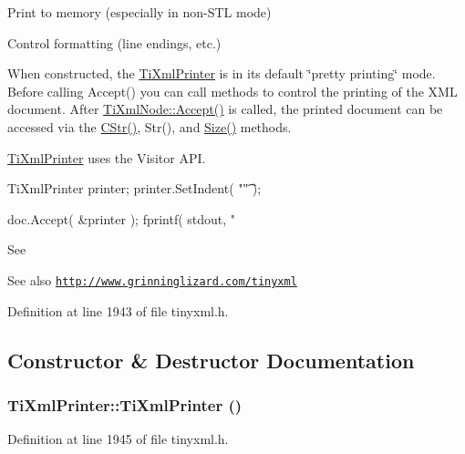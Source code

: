 \begin{DoxyEnumerate}
\item Print to memory (especially in non-\/STL mode)
\item Control formatting (line endings, etc.)
\end{DoxyEnumerate}

When constructed, the \hyperlink{class_ti_xml_printer}{TiXmlPrinter} is in its default \char`\"{}pretty printing\char`\"{} mode. Before calling Accept() you can call methods to control the printing of the XML document. After \hyperlink{class_ti_xml_node_acc0f88b7462c6cb73809d410a4f5bb86}{TiXmlNode::Accept()} is called, the printed document can be accessed via the \hyperlink{class_ti_xml_printer_a859eede9597d3e0355b77757be48735e}{CStr()}, Str(), and \hyperlink{class_ti_xml_printer_ad01375ae9199bd2f48252eaddce3039d}{Size()} methods.

\hyperlink{class_ti_xml_printer}{TiXmlPrinter} uses the Visitor API. \begin{DoxyVerb}
    TiXmlPrinter printer;
    printer.SetIndent( "\t" );

    doc.Accept( &printer );
    fprintf( stdout, "%
    \end{DoxyVerb}


See \begin{DoxySeeAlso}{See also}
\href{http://www.grinninglizard.com/tinyxml}{\tt http://www.grinninglizard.com/tinyxml} 
\end{DoxySeeAlso}


Definition at line 1943 of file tinyxml.h.

\subsection{Constructor \& Destructor Documentation}
\hypertarget{class_ti_xml_printer_a6539b864026c8667cd0bd5fdf4b41f43}{
\subsubsection[{TiXmlPrinter}]{\setlength{\rightskip}{0pt plus 5cm}TiXmlPrinter::TiXmlPrinter ()}}
\label{class_ti_xml_printer_a6539b864026c8667cd0bd5fdf4b41f43}


Definition at line 1945 of file tinyxml.h.

